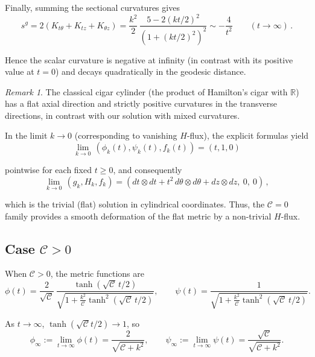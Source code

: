 \documentclass[12pt,a4paper,reqno]{amsart}
\theoremstyle{plain}
\theoremstyle{remark}
\newtheorem{remark}[theorem]{Remark}
\numberwithin{equation}{section}
\newcommand{\cC}{\mathcal{C}}
\newcommand{\R}{\mathbb{R}}
\begin{document}
Finally, summing the sectional curvatures gives
\begin{equation*}
s^g = 2\left(K_{t\theta}+K_{tz}+K_{\theta z}\right) = \frac{k^{2}}{2} \,\frac{5-2(kt/2)^{2}}{\left(1+(kt/2)^{2}\right)^{2}} \sim -\frac{4}{t^{2}}\qquad (t\to\infty) \,.
\end{equation*}

Hence the scalar curvature is negative at infinity (in contrast with its positive value at $t=0$) and decays quadratically in the geodesic distance.

\begin{remark}
The classical cigar cylinder \cite{Hamilton1988,Hamilton1995} (the product of Hamilton's cigar with $\R$) has a flat axial direction and strictly positive curvatures in the transverse directions, in contrast with our solution with mixed curvatures.
\end{remark}

In the limit $k \to 0$ (corresponding to vanishing $H$-flux), the explicit formulas yield
\begin{equation*}
\lim_{k \to 0} \,\left( \phi_k(t), \psi_k(t), f_k(t) \right) = (t, 1, 0)
\end{equation*}

pointwise for each fixed $t \ge 0$, and consequently
\begin{equation*}
\lim_{k \to 0} \,\left(g_k, H_k, f_k\right) = \left( dt\otimes dt + t^2 \,d\theta\otimes d\theta + dz\otimes dz,\ 0,\ 0 \right) \,,
\end{equation*}

which is the trivial (flat) solution in cylindrical coordinates. Thus, the $\cC=0$ family provides a smooth deformation of the flat metric by a non-trivial $H$-flux.

\subsection{Case $\cC>0$}

When $\cC>0$, the metric functions are
\begin{equation*}
\phi(t)=\frac{2}{\sqrt{\cC}}\,
\frac{\tanh(\sqrt{\cC}\,t/2)}{\sqrt{1 + \frac{k^{2}}{\cC}\tanh^{2}(\sqrt{\cC}\,t/2)}},\qquad
\psi(t)=\frac{1}{\sqrt{1 + \frac{k^{2}}{\cC}\tanh^{2}(\sqrt{\cC}\,t/2)}} .
\end{equation*}

As $t\to\infty$, $\tanh(\sqrt{\cC}t/2)\to 1$, so
\begin{equation*}
\phi_{\infty}:=\lim_{t\to\infty}\phi(t)=\frac{2}{\sqrt{\cC+k^{2}}},\qquad
\psi_{\infty}:=\lim_{t\to\infty}\psi(t)=\frac{\sqrt{\cC}}{\sqrt{\cC+k^{2}}}.
\end{equation*}
\end{document}
